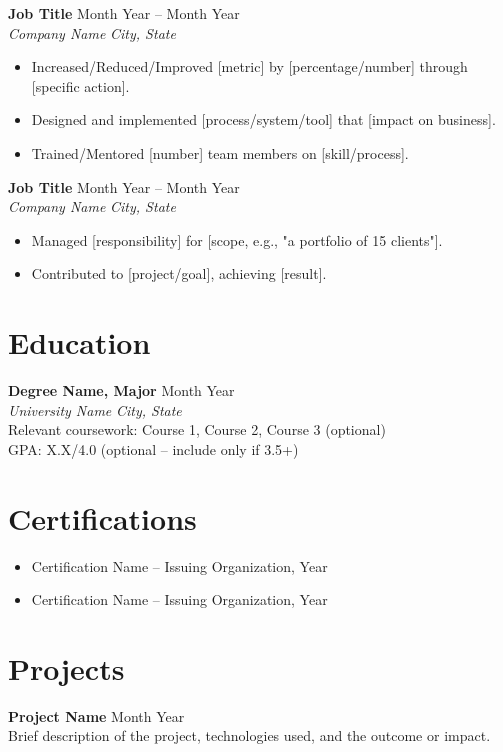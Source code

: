 \documentclass[11pt,letterpaper]{article}
\newcommand{\resumeEntry}[4]{%
    \textbf{#1} \hfill #2 \\
    \textit{#3} \hfill \textit{#4}
}
\begin{document}
\vspace{6pt}

\resumeEntry{Job Title}{Month Year -- Month Year}{Company Name}{City, State}
\begin{itemize}
    \item Increased/Reduced/Improved [metric] by [percentage/number] through [specific action].
    \item Designed and implemented [process/system/tool] that [impact on business].
    \item Trained/Mentored [number] team members on [skill/process].
\end{itemize}

\vspace{6pt}

\resumeEntry{Job Title}{Month Year -- Month Year}{Company Name}{City, State}
\begin{itemize}
    \item Managed [responsibility] for [scope, e.g., "a portfolio of 15 clients"].
    \item Contributed to [project/goal], achieving [result].
\end{itemize}

\section*{Education}
\textbf{Degree Name, Major} \hfill Month Year \\
\textit{University Name} \hfill \textit{City, State} \\
Relevant coursework: Course 1, Course 2, Course 3 (optional) \\
GPA: X.X/4.0 (optional -- include only if 3.5+)

\section*{Certifications}
\begin{itemize}
    \item Certification Name -- Issuing Organization, Year
    \item Certification Name -- Issuing Organization, Year
\end{itemize}

\section*{Projects}
\textbf{Project Name} \hfill Month Year \\
Brief description of the project, technologies used, and the outcome or impact.
\end{document}
